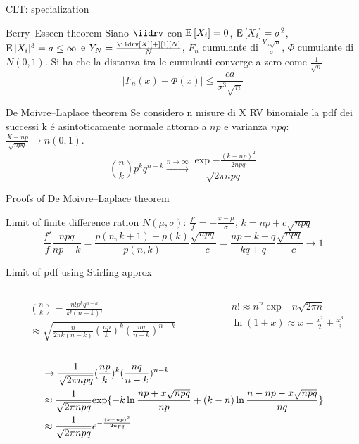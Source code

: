 \documentclass[asd-beamer.tex]{subfiles}%
\begin{document}
\begin{frame}{CLT: specialization}
\begin{block}{Berry–Esseen theorem}
Siano $\iidrv$ con $\operatorname{E}{[X_i]}=0$, $\operatorname{E}{[X_i]}=\sigma^2$, $\operatorname{E}{|X_i|^3}=a\leq\infty$ e $Y_N=\frac{\iidrv[X][+][1][N]}{N}$, $F_n$ cumulante di $\frac{Y_n\sqrt{n}}{\sigma}$, $\Phi$ cumulante di $N(0,1)$. Si ha che la distanza tra le cumulanti converge a zero come $\frac{1}{\sqrt{n}}$
\[|F_n(x)-\Phi(x)|\leq\frac{ca}{\sigma^3\sqrt{n}}\]
\end{block}
\begin{block}{De Moivre–Laplace theorem}
Se considero n misure di X RV binomiale la pdf dei successi k \'e asintoticamente normale attorno a $np$ e varianza $npq$: $\frac{X-np}{\sqrt{npq}}\to n(0,1)$.
\[\binom{n}{k}p^kq^{n-k}\xrightarrow{n\to\infty}\frac{\exp{-\frac{(k-np)^2}{2npq}}}{\sqrt{2\pi npq}}\]
\end{block}
\end{frame}

\begin{frame}{Proofs of De Moivre–Laplace theorem}
\begin{block}{Limit of finite difference ration}
$N(\mu,\sigma)$: $\frac{f'}{f}=-\frac{x-\mu}{\sigma}$, $k=np+c\sqrt{npq}$
\[\frac{f'}{f}\frac{npq}{np-k}=\frac{p(n,k+1)-p(k)}{p(n,k)}\frac{\sqrt{npq}}{-c}=\frac{np-k-q}{kq+q}\frac{\sqrt{npq}}{-c}\to1\]
\end{block}
\begin{block}{Limit of pdf using Stirling approx}
\begin{columns}[T]
	\begin{column}{0.4\textwidth}
		\begin{align*}
		&\binom{n}{k}=\frac{n!p^kq^{n-k}}{k!(n-k)!}\\
		&\approx\sqrt{\frac{n}{2\pi k(n-k)}(\frac{np}{k})^k(\frac{nq}{n-k})^{n-k}}%
		\end{align*}
	\end{column}
	\begin{column}{0.6\textwidth}
\begin{align*}
&n!\approx n^n\exp{-n}\sqrt{2\pi n}\tag{Stirling approx}\\
&\ln{(1+x)}\approx x-\frac{x^2}{2}+\frac{x^3}{3}
\end{align*}
	\end{column}
\end{columns}
\begin{align*}
&\to\frac{1}{\sqrt{2\pi npq}}(\frac{np}{k})^k(\frac{nq}{n-k})^{n-k}\\
&\approx\frac{1}{\sqrt{2\pi npq}}\text{exp}\{-k\ln{\frac{np+x\sqrt{npq}}{np}}+(k-n)\ln{\frac{n-np-x\sqrt{npq}}{nq}}\}\\
&\approx\frac{1}{\sqrt{2\pi npq}}e^{-\frac{(k-np)^2}{2npq}}
\end{align*}
\end{block}
\end{frame}
\end{document}
